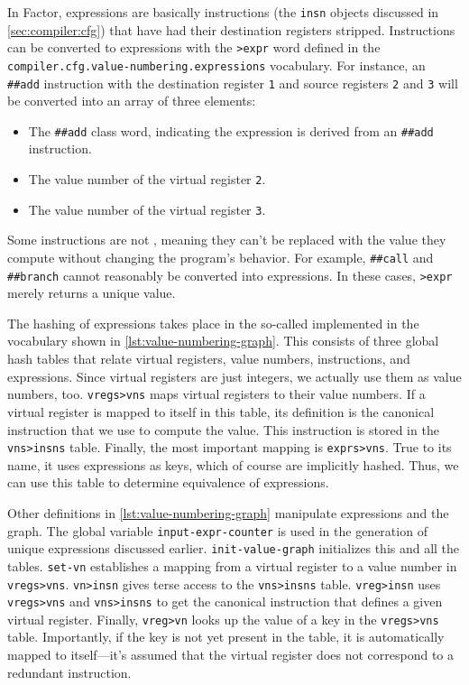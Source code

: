 \begin{sloppypar}
In Factor, expressions are basically instructions (the \Verb|insn| objects
discussed in \cref{sec:compiler:cfg}) that have had their destination registers
stripped.  Instructions can be converted to expressions with the \Verb|>expr|
word defined in the \Verb|compiler.cfg.value-numbering.expressions|
vocabulary.  For instance, an \Verb|##add| instruction with the destination
register \Verb|1| and source registers \Verb|2| and \Verb|3| will be
converted into an array of three elements:
%
\begin{itemize}
%
  \item The \Verb|##add| class word, indicating the expression is derived
        from an \Verb|##add| instruction.
%
  \item The value number of the virtual register \Verb|2|.
%
  \item The value number of the virtual register \Verb|3|.
%
\end{itemize}
%
\noindent Some instructions are not , meaning
they can't be replaced with the value they compute without changing the
program's behavior.  For example, \Verb|##call| and \Verb|##branch| cannot
reasonably be converted into expressions.  In these cases, \Verb|>expr|
merely returns a unique value.
\end{sloppypar}


The hashing of expressions takes place in the so-called 
implemented in the vocabulary shown in \vref{lst:value-numbering-graph}.  This
consists of three global hash tables that relate virtual registers, value
numbers, instructions, and expressions.  Since virtual registers are just
integers, we actually use them as value numbers, too.  \Verb|vregs>vns| maps
virtual registers to their value numbers.  If a virtual register  is mapped to
itself in this table, its definition is the canonical instruction that we use
to compute the value.  This instruction is stored in the \Verb|vns>insns| table.  Finally, the most important mapping is \Verb|exprs>vns|.  True to its
name, it uses expressions as keys, which of course are implicitly hashed.
Thus, we can use this table to determine equivalence of expressions.

Other definitions in \vref{lst:value-numbering-graph} manipulate expressions
and the graph.  The global variable \Verb|input-expr-counter| is used in the
generation of unique expressions discussed earlier.  \Verb|init-value-graph|
initializes this and all the tables.  \Verb|set-vn| establishes a mapping
from a virtual register to a value number in \Verb|vregs>vns|.
\Verb|vn>insn| gives terse access to the \Verb|vns>insns| table.
\Verb|vreg>insn| uses \Verb|vregs>vns| and \Verb|vns>insns| to get the
canonical instruction that defines a given virtual register.  Finally,
\Verb|vreg>vn| looks up the value of a key in the \Verb|vregs>vns| table.
Importantly, if the key is not yet present in the table, it is automatically
mapped to itself---it's assumed that the virtual register does not correspond
to a redundant instruction.


